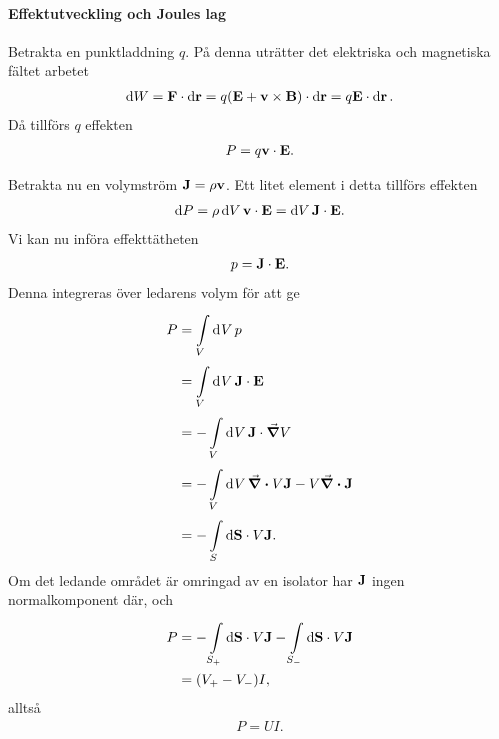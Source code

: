 \paragraph{Effektutveckling och Joules lag}
Betrakta en punktladdning $q$. På denna uträtter det elektriska och magnetiska fältet arbetet
\begin{align*}
	\dd{W} = \vb{F}\cdot\dd{\vb{r}} = q(\vb{E} + \vb{v}\times\vb{B})\cdot\dd{\vb{r}} = q\vb{E}\cdot\dd{\vb{r}}.
\end{align*}
Då tillförs $q$ effekten
\begin{align*}
	P = q\vb{v}\cdot\vb{E}.
\end{align*}

Betrakta nu en volymström $\vb{J} = \rho\vb{v}$. Ett litet element i detta tillförs effekten
\begin{align*}
	\dd{P} = \rho\dd{V}\vb{v}\cdot\vb{E} = \dd{V}\vb{J}\cdot\vb{E}.
\end{align*}
Vi kan nu införa effekttätheten
\begin{align*}
	p = \vb{J}\cdot\vb{E}.
\end{align*}
Denna integreras över ledarens volym för att ge
\begin{align*}
	P &= \int\limits_{V}^{}\dd[]{V}p \\
	  &= \int\limits_{V}^{}\dd[]{V}\vb{J}\cdot\vb{E} \\
	  &= -\int\limits_{V}^{}\dd[]{V}\vb{J}\cdot\grad{V} \\
	  &= -\int\limits_{V}^{}\dd[]{V}\div{V\vb{J}} - V\div{\vb{J}} \\
	  &= -\int\limits_{S}^{}\dd{\vb{S}}\cdot V\vb{J}.
\end{align*}
Om det ledande området är omringad av en isolator har $\vb{J}$ ingen normalkomponent där, och
\begin{align*}
	P &= -\int\limits_{S_{+}}^{}\dd{\vb{S}}\cdot V\vb{J} - \int\limits_{S_{-}}^{}\dd{\vb{S}}\cdot V\vb{J} \\
	  &= (V_{+} - V_{-})I,
\end{align*}
alltså
\begin{align*}
	P = UI.
\end{align*}

